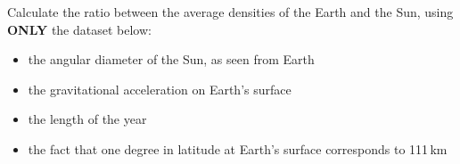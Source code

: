 Calculate the ratio between the average densities of the Earth and the Sun,
using \textbf{ONLY} the dataset below:
\begin{itemize}
\item the angular diameter of the Sun, as seen from Earth
\item the gravitational acceleration on Earth's surface
\item the length of the year
\item the fact that one degree in latitude at Earth's surface corresponds to
  111\,km
\end{itemize}
